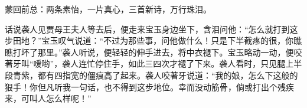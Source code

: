 \begin{parag}
    \begin{note}蒙回前总：两条素怡，一片真心，三首新诗，万行珠泪。\end{note}
\end{parag}


\begin{parag}
    话说袭人见贾母王夫人等去后，便走来宝玉身边坐下，含泪问他：“怎么就打到这步田地？”宝玉叹气说道：“不过为那些事，问他做什么！只是下半截疼的很，你瞧瞧打坏了那里。”袭人听说，便轻轻的伸手进去，将中衣褪下。宝玉略动一动，便咬著牙叫“嗳哟”，袭人连忙停住手，如此三四次才褪了下来。袭人看时，只见腿上半段青紫，都有四指宽的僵痕高了起来。袭人咬著牙说道：“我的娘，怎么下这般的狠手！你但凡听我一句话，也不得到这步地位。幸而没动筋骨，倘或打出个残疾来，可叫人怎么样呢！”
\end{parag}


